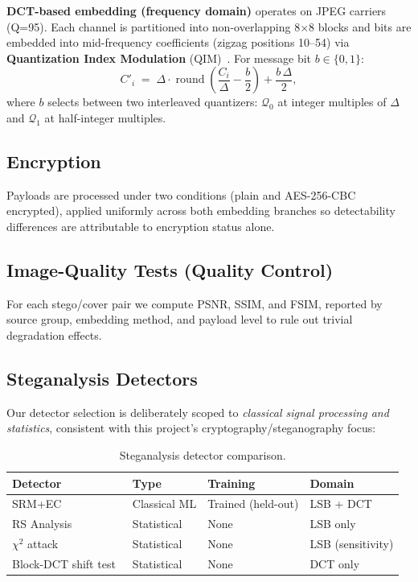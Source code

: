 \documentclass[10pt,twocolumn,a4paper]{article}
\begin{document}
\textbf{DCT-based embedding (frequency domain)} operates on JPEG carriers (Q=95). Each channel is partitioned into non-overlapping 8$\times$8 blocks and bits are embedded into mid-frequency coefficients (zigzag positions 10--54) via \textbf{Quantization Index Modulation} (QIM)~\cite{chen_wornell2001}. For message bit $b\!\in\!\{0,1\}$:
\[
C'_i \;=\; \Delta\cdot\operatorname{round}\!\left(\frac{C_i}{\Delta} - \frac{b}{2}\right) + \frac{b\,\Delta}{2},
\]
where $b$ selects between two interleaved quantizers: $\mathcal{Q}_0$ at integer multiples of $\Delta$ and $\mathcal{Q}_1$ at half-integer multiples.

\subsection{Encryption}

Payloads are processed under two conditions (plain and AES-256-CBC encrypted), applied uniformly across both embedding branches so detectability differences are attributable to encryption status alone.

\subsection{Image-Quality Tests (Quality Control)}

For each stego/cover pair we compute PSNR, SSIM, and FSIM, reported by source group, embedding method, and payload level to rule out trivial degradation effects.

\subsection{Steganalysis Detectors}

Our detector selection is deliberately scoped to \emph{classical signal processing and statistics}, consistent with this project's cryptography/steganography focus:

\begin{table}[h]
\centering
\caption{Steganalysis detector comparison.}
\label{tab:detectors}
\scriptsize
\setlength{\tabcolsep}{4pt}
\begin{tabular}{@{}llll@{}}
\toprule
\textbf{Detector} & \textbf{Type} & \textbf{Training} & \textbf{Domain} \\
\midrule
SRM+EC~\cite{fridrich2012srm,kodovsky2012ec} & Classical ML & Trained (held-out) & LSB + DCT \\
RS Analysis~\cite{fridrich2001lsb} & Statistical & None & LSB only \\
$\chi^2$ attack~\cite{westfeld1999chi} & Statistical & None & LSB (sensitivity) \\
Block-DCT shift test~\cite{wangmoulin2003dct} & Statistical & None & DCT only \\
\bottomrule
\end{tabular}
\end{table}
\end{document}
